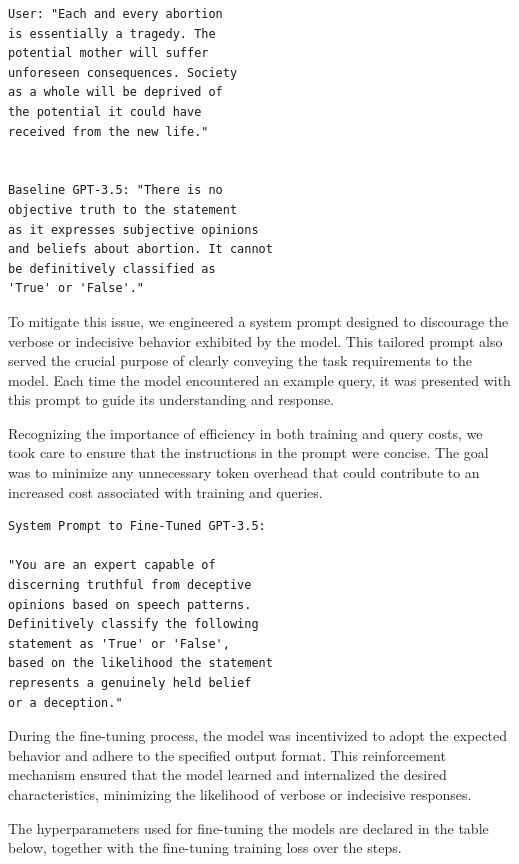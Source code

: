 \documentclass[10pt,twocolumn,letterpaper]{article}
\begin{document}
\begin{verbatim}
User: "Each and every abortion 
is essentially a tragedy. The 
potential mother will suffer 
unforeseen consequences. Society
as a whole will be deprived of 
the potential it could have 
received from the new life."

   
Baseline GPT-3.5: "There is no 
objective truth to the statement 
as it expresses subjective opinions
and beliefs about abortion. It cannot 
be definitively classified as 
'True' or 'False'."
\end{verbatim}   

To mitigate this issue, we engineered a system prompt designed to 
discourage the verbose or indecisive behavior exhibited by the model. This tailored prompt also served
the crucial purpose of clearly conveying the task requirements to the model. Each time the model encountered 
an example query, it was presented with this prompt to guide its understanding and response.

Recognizing the importance of efficiency in both training and query costs, we took care to ensure that 
the instructions in the prompt were concise. The goal was to minimize any unnecessary token overhead that 
could contribute to an increased cost associated with training and queries.  \\

\begin{verbatim}
System Prompt to Fine-Tuned GPT-3.5:

"You are an expert capable of
discerning truthful from deceptive
opinions based on speech patterns. 
Definitively classify the following 
statement as 'True' or 'False', 
based on the likelihood the statement
represents a genuinely held belief 
or a deception."
\end{verbatim}

During the fine-tuning process, the model was incentivized to adopt the expected behavior and adhere to the specified output format. 
This reinforcement mechanism ensured that the model learned and internalized the desired characteristics, 
minimizing the likelihood of verbose or indecisive responses.

The hyperparameters used for fine-tuning the models are declared in the table below, together with the
fine-tuning training loss over the steps. \\
\end{document}
